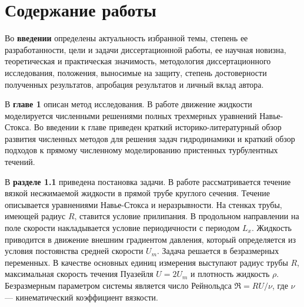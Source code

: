 \section*{\centering Содержание работы}

Во \textbf{введении} определены актуальность избранной темы, степень ее разработанности, цели и задачи диссертационной работы, ее научная новизна, теоретическая и практическая значимость, методология диссертационного исследования, положения, выносимые на защиту, степень достоверности полученных результатов, апробация результатов и личный вклад автора. 

В {\bf главе 1} описан метод исследования. В работе движение жидкости моделируется численными решениями полных трехмерных уравнений Навье-Стокса. 
Во введении к главе приведен краткий историко-литературный обзор развития численных методов для решения задач гидродинамики и краткий обзор подходов к прямому численному моделированию пристенных турбулентных течений. 

В \textbf{разделе 1.1} приведена постановка задачи. В работе рассматривается течение вязкой несжимаемой жидкости в прямой трубе круглого сечения. Течение описывается уравнениями Навье-Стокса и неразрывности.
На стенках трубы, имеющей радиус $R$, ставится условие прилипания. В продольном направлении на поле скорости накладывается условие периодичности с периодом $L_x$. Жидкость приводится в движение внешним градиентом давления, который определяется из условия постоянства средней скорости $U_m$. Задача решается в безразмерных переменных. В качестве основных единиц измерения выступают радиус трубы $R$, максимальная скорость течения Пуазейля $U = 2U_m$ и плотность жидкость $\rho$. Безразмерным параметром системы является число Рейнольдса $ \Re = {R U}/{\nu}$, где $\nu$ --- кинематический коэффициент вязкости.

